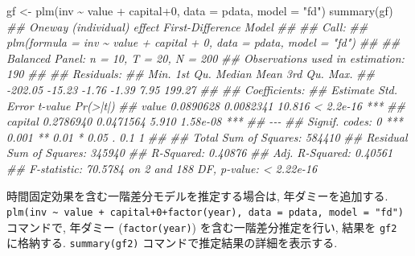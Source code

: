 \documentclass[
  letterpaper,
  xelatex,
  ja=standard, xelatex]{bxjsbook}
\newenvironment{Shaded}{\begin{snugshade}}{\end{snugshade}}
\newcommand{\AttributeTok}[1]{\textcolor[rgb]{0.40,0.45,0.13}{#1}}
\newcommand{\DecValTok}[1]{\textcolor[rgb]{0.68,0.00,0.00}{#1}}
\newcommand{\DocumentationTok}[1]{\textcolor[rgb]{0.37,0.37,0.37}{\textit{#1}}}
\newcommand{\FunctionTok}[1]{\textcolor[rgb]{0.28,0.35,0.67}{#1}}
\newcommand{\NormalTok}[1]{\textcolor[rgb]{0.00,0.23,0.31}{#1}}
\newcommand{\OtherTok}[1]{\textcolor[rgb]{0.00,0.23,0.31}{#1}}
\newcommand{\SpecialCharTok}[1]{\textcolor[rgb]{0.37,0.37,0.37}{#1}}
\newcommand{\StringTok}[1]{\textcolor[rgb]{0.13,0.47,0.30}{#1}}
\begin{document}
\begin{Shaded}
\begin{Highlighting}[]
\NormalTok{gf }\OtherTok{\textless{}{-}} \FunctionTok{plm}\NormalTok{(inv }\SpecialCharTok{\textasciitilde{}}\NormalTok{ value }\SpecialCharTok{+}\NormalTok{ capital}\SpecialCharTok{+}\DecValTok{0}\NormalTok{, }\AttributeTok{data =}\NormalTok{ pdata, }\AttributeTok{model =} \StringTok{"fd"}\NormalTok{)}
\FunctionTok{summary}\NormalTok{(gf)}
\DocumentationTok{\#\# Oneway (individual) effect First{-}Difference Model}
\DocumentationTok{\#\# }
\DocumentationTok{\#\# Call:}
\DocumentationTok{\#\# plm(formula = inv \textasciitilde{} value + capital + 0, data = pdata, model = "fd")}
\DocumentationTok{\#\# }
\DocumentationTok{\#\# Balanced Panel: n = 10, T = 20, N = 200}
\DocumentationTok{\#\# Observations used in estimation: 190}
\DocumentationTok{\#\# }
\DocumentationTok{\#\# Residuals:}
\DocumentationTok{\#\#    Min. 1st Qu.  Median    Mean 3rd Qu.    Max. }
\DocumentationTok{\#\# {-}202.05  {-}15.23   {-}1.76   {-}1.39    7.95  199.27 }
\DocumentationTok{\#\# }
\DocumentationTok{\#\# Coefficients:}
\DocumentationTok{\#\#          Estimate Std. Error t{-}value  Pr(\textgreater{}|t|)    }
\DocumentationTok{\#\# value   0.0890628  0.0082341  10.816 \textless{} 2.2e{-}16 ***}
\DocumentationTok{\#\# capital 0.2786940  0.0471564   5.910  1.58e{-}08 ***}
\DocumentationTok{\#\# {-}{-}{-}}
\DocumentationTok{\#\# Signif. codes:  0 \textquotesingle{}***\textquotesingle{} 0.001 \textquotesingle{}**\textquotesingle{} 0.01 \textquotesingle{}*\textquotesingle{} 0.05 \textquotesingle{}.\textquotesingle{} 0.1 \textquotesingle{} \textquotesingle{} 1}
\DocumentationTok{\#\# }
\DocumentationTok{\#\# Total Sum of Squares:    584410}
\DocumentationTok{\#\# Residual Sum of Squares: 345940}
\DocumentationTok{\#\# R{-}Squared:      0.40876}
\DocumentationTok{\#\# Adj. R{-}Squared: 0.40561}
\DocumentationTok{\#\# F{-}statistic: 70.5784 on 2 and 188 DF, p{-}value: \textless{} 2.22e{-}16}
\end{Highlighting}
\end{Shaded}

時間固定効果を含む一階差分モデルを推定する場合は, 年ダミーを追加する.
\texttt{plm(inv\ \textasciitilde{}\ value\ +\ capital+0+factor(year),\ data\ =\ pdata,\ model\ =\ "fd")}
コマンドで, 年ダミー (\texttt{factor(year)}) を含む一階差分推定を行い,
結果を \texttt{gf2} に格納する. \texttt{summary(gf2)}
コマンドで推定結果の詳細を表示する.
\end{document}
